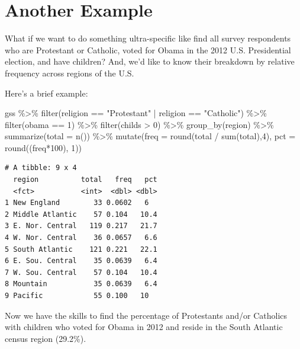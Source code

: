 \documentclass[
  letterpaper,
]{book}
\newenvironment{Shaded}{\begin{snugshade}}{\end{snugshade}}
\newcommand{\AttributeTok}[1]{\textcolor[rgb]{0.40,0.45,0.13}{#1}}
\newcommand{\DecValTok}[1]{\textcolor[rgb]{0.68,0.00,0.00}{#1}}
\newcommand{\FunctionTok}[1]{\textcolor[rgb]{0.28,0.35,0.67}{#1}}
\newcommand{\NormalTok}[1]{\textcolor[rgb]{0.00,0.23,0.31}{#1}}
\newcommand{\SpecialCharTok}[1]{\textcolor[rgb]{0.37,0.37,0.37}{#1}}
\newcommand{\StringTok}[1]{\textcolor[rgb]{0.13,0.47,0.30}{#1}}
\begin{document}
\hypertarget{another-example}{%
\section{Another Example}\label{another-example}}

What if we want to do something ultra-specific like find all survey
respondents who are Protestant or Catholic, voted for Obama in the 2012
U.S. Presidential election, and have children? And, we'd like to know
their breakdown by relative frequency across regions of the U.S.

Here's a brief example:

\begin{Shaded}
\begin{Highlighting}[]
\NormalTok{gss }\SpecialCharTok{\%\textgreater{}\%}
  \FunctionTok{filter}\NormalTok{(religion }\SpecialCharTok{==} \StringTok{"Protestant"} \SpecialCharTok{|}\NormalTok{ religion }\SpecialCharTok{==} \StringTok{"Catholic"}\NormalTok{) }\SpecialCharTok{\%\textgreater{}\%}
  \FunctionTok{filter}\NormalTok{(obama }\SpecialCharTok{==} \DecValTok{1}\NormalTok{) }\SpecialCharTok{\%\textgreater{}\%}
  \FunctionTok{filter}\NormalTok{(childs }\SpecialCharTok{\textgreater{}} \DecValTok{0}\NormalTok{) }\SpecialCharTok{\%\textgreater{}\%}
  \FunctionTok{group\_by}\NormalTok{(region) }\SpecialCharTok{\%\textgreater{}\%}
  \FunctionTok{summarize}\NormalTok{(}\AttributeTok{total =} \FunctionTok{n}\NormalTok{()) }\SpecialCharTok{\%\textgreater{}\%}
  \FunctionTok{mutate}\NormalTok{(}\AttributeTok{freq =} \FunctionTok{round}\NormalTok{(total }\SpecialCharTok{/} \FunctionTok{sum}\NormalTok{(total),}\DecValTok{4}\NormalTok{),}
         \AttributeTok{pct =} \FunctionTok{round}\NormalTok{((freq}\SpecialCharTok{*}\DecValTok{100}\NormalTok{), }\DecValTok{1}\NormalTok{))}
\end{Highlighting}
\end{Shaded}

\begin{verbatim}
# A tibble: 9 x 4
  region          total   freq   pct
  <fct>           <int>  <dbl> <dbl>
1 New England        33 0.0602   6  
2 Middle Atlantic    57 0.104   10.4
3 E. Nor. Central   119 0.217   21.7
4 W. Nor. Central    36 0.0657   6.6
5 South Atlantic    121 0.221   22.1
6 E. Sou. Central    35 0.0639   6.4
7 W. Sou. Central    57 0.104   10.4
8 Mountain           35 0.0639   6.4
9 Pacific            55 0.100   10  
\end{verbatim}

Now we have the skills to find the percentage of Protestants and/or
Catholics with children who voted for Obama in 2012 and reside in the
South Atlantic census region (29.2\%).
\end{document}
